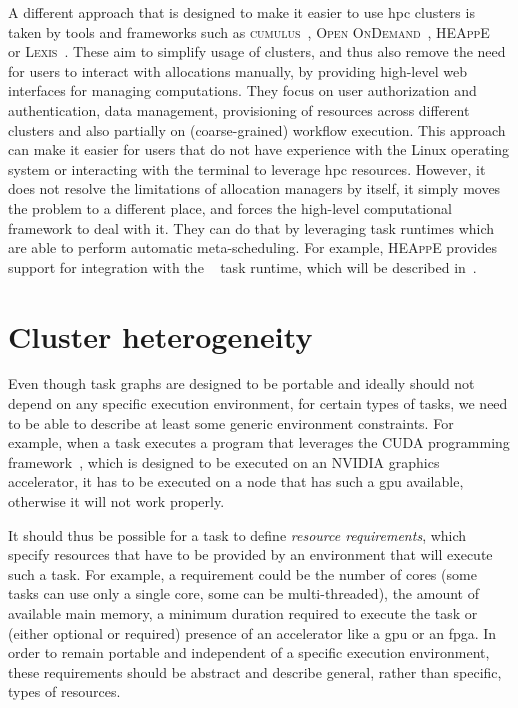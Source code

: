 A different approach that is designed to make it easier to use \gls{hpc}
clusters is taken by tools and frameworks such as \textsc{cumulus}~\cite{cumulus}, \textsc{Open
OnDemand}~\cite{openondemand}, \textsc{HEAppE}~\cite{heappe} or \textsc{Lexis}~\cite{lexis}.
These aim to simplify usage of clusters, and thus also remove the need for users to interact
with allocations manually, by providing high-level web interfaces for managing
computations. They focus on user authorization and authentication, data management, provisioning of
resources across different clusters and also partially on (coarse-grained) workflow execution. This
approach can make it easier for users that do not have experience with the Linux operating system
or interacting with the terminal to leverage \gls{hpc} resources. However, it does not resolve
the limitations of allocation managers by itself, it simply moves the problem to a different
place, and forces the high-level computational framework to deal with it. They can do that
by leveraging task runtimes which are able to perform automatic meta-scheduling. For example,
\textsc{HEAppE} provides support for integration with the \hyperqueue{}~\cite{heappe_hq}
task runtime, which will be described in~.

\section{Cluster heterogeneity}
Even though task graphs are designed to be portable and ideally should not depend on any specific
execution environment, for certain types of tasks, we need to be able to describe at least some
generic environment constraints. For example, when a task executes a program that leverages the
CUDA programming framework~\cite{cuda}, which is designed to be executed on an
NVIDIA graphics accelerator, it has to be executed on a node that has such a
\gls{gpu} available, otherwise it will not work properly.

It should thus be possible for a task to define \emph{resource requirements}, which specify
resources that have to be provided by an environment that will execute such a task. For example, a
requirement could be the number of cores (some tasks can use only a single core, some can be
multi-threaded), the amount of available main memory, a minimum duration required to execute the
task or (either optional or required) presence of an accelerator like a \gls{gpu}
or an \gls{fpga}. In order to remain portable and independent of a specific
execution environment, these requirements should be abstract and describe general, rather than
specific, types of resources.


